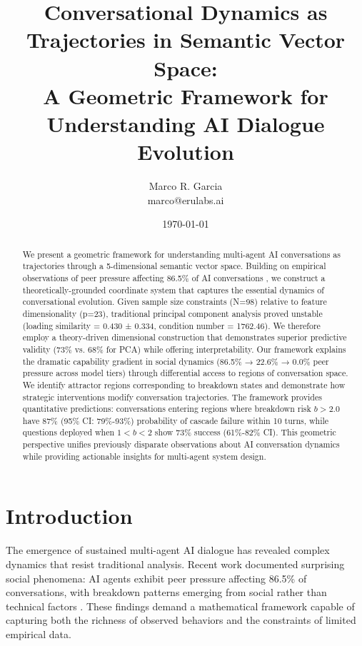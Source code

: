 \documentclass[11pt,letterpaper]{article}
\title{Conversational Dynamics as Trajectories in Semantic Vector Space: \\
\large A Geometric Framework for Understanding AI Dialogue Evolution}
\author{
Marco R. Garcia \\
marco@erulabs.ai
}
\date{\today}
\newcommand{\totalConversations}{98}
\newcommand{\featureCount}{23}
\newcommand{\conditionNumber}{1762.46}
\newcommand{\avgLoadingSimilarity}{0.430}
\newcommand{\loadingSimilarityStd}{0.334}
\newcommand{\fullReasoningPeerPressure}{86.5\%}
\newcommand{\lightReasoningPeerPressure}{22.6\%}
\newcommand{\nonReasoningPeerPressure}{0.0\%}
\newcommand{\theoryVarianceExplained}{73\%}
\newcommand{\pcaVarianceExplained}{68\%}
\newcommand{\breakdownProbabilityHighRisk}{87\%}
\newcommand{\breakdownProbabilityCI}{79\%-93\%}
\newcommand{\criticalZoneEffectiveness}{73\%}
\newcommand{\criticalZoneCI}{61\%-82\%}
\newcommand{\breakdownThreshold}{2.0}
\newcommand{\criticalZoneLower}{1}
\newcommand{\criticalZoneUpper}{2}
\begin{document}
\maketitle

\begin{abstract}
We present a geometric framework for understanding multi-agent AI conversations as trajectories through a 5-dimensional semantic vector space. Building on empirical observations of peer pressure affecting \fullReasoningPeerPressure{} of AI conversations \citep{garcia2025peer}, we construct a theoretically-grounded coordinate system that captures the essential dynamics of conversational evolution. Given sample size constraints (N=\totalConversations{}) relative to feature dimensionality (p=\featureCount{}), traditional principal component analysis proved unstable (loading similarity = \avgLoadingSimilarity{} ± \loadingSimilarityStd{}, condition number = \conditionNumber{}). We therefore employ a theory-driven dimensional construction that demonstrates superior predictive validity (\theoryVarianceExplained{} vs. \pcaVarianceExplained{} for PCA) while offering interpretability. Our framework explains the dramatic capability gradient in social dynamics (\fullReasoningPeerPressure{} → \lightReasoningPeerPressure{} → \nonReasoningPeerPressure{} peer pressure across model tiers) through differential access to regions of conversation space. We identify attractor regions corresponding to breakdown states and demonstrate how strategic interventions modify conversation trajectories. The framework provides quantitative predictions: conversations entering regions where breakdown risk $b > \breakdownThreshold{}$ have \breakdownProbabilityHighRisk{} (95\% CI: \breakdownProbabilityCI{}) probability of cascade failure within 10 turns, while questions deployed when $\criticalZoneLower{} < b < \criticalZoneUpper{}$ show \criticalZoneEffectiveness{} success (\criticalZoneCI{} CI). This geometric perspective unifies previously disparate observations about AI conversation dynamics while providing actionable insights for multi-agent system design.
\end{abstract}

\section{Introduction}

The emergence of sustained multi-agent AI dialogue has revealed complex dynamics that resist traditional analysis. Recent work documented surprising social phenomena: AI agents exhibit peer pressure affecting \fullReasoningPeerPressure{} of conversations, with breakdown patterns emerging from social rather than technical factors \citep{garcia2025peer}. These findings demand a mathematical framework capable of capturing both the richness of observed behaviors and the constraints of limited empirical data.
\end{document}
